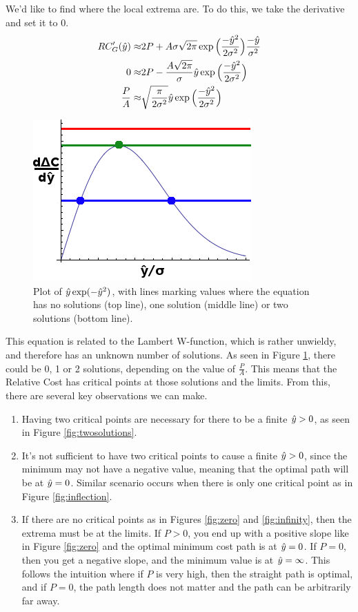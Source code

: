 We'd like to find where the local extrema are. To do this, we take the derivative and set it to 0. 
\begin{align}
RC'_G(\hat{y}) \approx& 2P + A\sigma\sqrt{2\pi}             \exp\Big( \frac{-\hat{y}^2}{2\sigma^2} \Big) \frac{-\hat{y}}{\sigma^2}\notag\\
0  \approx& 2P - \frac{A\sqrt{2\pi}}{\sigma}        \hat{y} \exp\Big( \frac{-\hat{y}^2}{2\sigma^2} \Big) \notag\\
  \frac{P}{A} \approx& \sqrt{\frac{\pi}{2\sigma^2}} \hat{y} \exp\Big( \frac{-\hat{y}^2}{2\sigma^2} \Big) 
\end{align}
\begin{figure}
\centering
\includegraphics[width=0.4\columnwidth]{graphix/lambert.png}
\caption{Plot of $\hat{y} \exp(-\hat{y}^2)$, with lines marking values where the equation has no solutions (top line), one solution (middle line) or two solutions (bottom line).}
\label{fig:lambert}
\end{figure}

This equation is related to the Lambert W-function, which is rather unwieldy, and therefore has an unknown number of solutions. As seen in Figure \ref{fig:lambert}, there could be 0, 1 or 2 solutions, depending on the value of $\frac{P}{A}$. This means that the Relative Cost has critical points at those solutions and the limits. From this, there are several key observations we can make. 
\begin{enumerate}
\item Having two critical points are necessary for there to be a finite $\hat{y}>0$, as seen in Figure \ref{fig:twosolutions}. 
\item It's not sufficient to have two critical points to cause a finite $\hat{y}>0$, since the minimum may not have a negative value, meaning that the optimal path will be at $\hat{y}=0$. Similar scenario occurs when there is only one critical point as in Figure \ref{fig:inflection}. 
\item If there are no critical points as in Figures \ref{fig:zero} and \ref{fig:infinity}, then the extrema must be at the limits. If $P>0$, you end up with a positive slope like in Figure \ref{fig:zero} and the optimal minimum cost path is at $\hat{y}=0$. If $P=0$, then you get a negative slope, and the minimum value is at $\hat{y}=\infty$. This follows the intuition where if $P$ is very high, then the straight path is optimal, and if $P=0$, the path length does not matter and the path can be arbitrarily far away. 
\end{enumerate}

